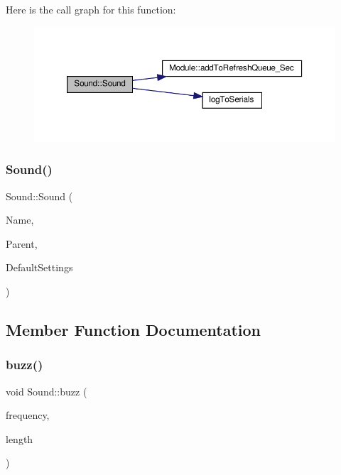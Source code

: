 Here is the call graph for this function\+:
\nopagebreak
\begin{figure}[H]
\begin{center}
\leavevmode
\includegraphics[width=350pt]{class_sound_a9432356bb1ba946460c33f286d2b325b_cgraph}
\end{center}
\end{figure}
\mbox{\label{class_sound_a9432356bb1ba946460c33f286d2b325b}} 
\subsubsection{\texorpdfstring{Sound()}{Sound()}\hspace{0.1cm}{\footnotesize\ttfamily [2/2]}}
{\footnotesize\ttfamily Sound\+::\+Sound (\begin{DoxyParamCaption}\item[{const \+\_\+\+\_\+\+Flash\+String\+Helper $\ast$}]{Name,  }\item[{\hyperlink{class_module}{Module} $\ast$}]{Parent,  }\item[{\hyperlink{struct_settings_1_1_sound_settings}{Settings\+::\+Sound\+Settings} $\ast$}]{Default\+Settings }\end{DoxyParamCaption})}



\subsection{Member Function Documentation}
\mbox{\label{class_sound_a3d0f7b044cff8851a335bb9c4fb78542}} 
\subsubsection{\texorpdfstring{buzz()}{buzz()}\hspace{0.1cm}{\footnotesize\ttfamily [1/2]}}
{\footnotesize\ttfamily void Sound\+::buzz (\begin{DoxyParamCaption}\item[{uint32\+\_\+t}]{frequency,  }\item[{uint32\+\_\+t}]{length }\end{DoxyParamCaption})\hspace{0.3cm}{\ttfamily [protected]}}



